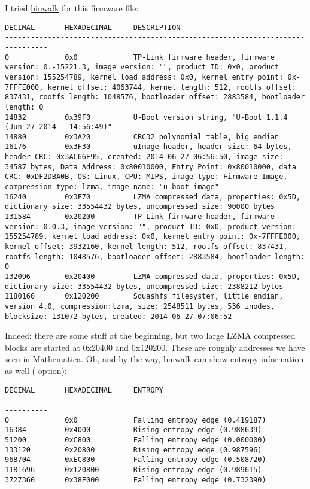 I tried \href{http://binwalk.org/}{binwalk} for this firmware file:

\begin{lstlisting}
DECIMAL       HEXADECIMAL     DESCRIPTION
--------------------------------------------------------------------------------
0             0x0             TP-Link firmware header, firmware version: 0.-15221.3, image version: "", product ID: 0x0, product version: 155254789, kernel load address: 0x0, kernel entry point: 0x-7FFFE000, kernel offset: 4063744, kernel length: 512, rootfs offset: 837431, rootfs length: 1048576, bootloader offset: 2883584, bootloader length: 0
14832         0x39F0          U-Boot version string, "U-Boot 1.1.4 (Jun 27 2014 - 14:56:49)"
14880         0x3A20          CRC32 polynomial table, big endian
16176         0x3F30          uImage header, header size: 64 bytes, header CRC: 0x3AC66E95, created: 2014-06-27 06:56:50, image size: 34587 bytes, Data Address: 0x80010000, Entry Point: 0x80010000, data CRC: 0xDF2DBA0B, OS: Linux, CPU: MIPS, image type: Firmware Image, compression type: lzma, image name: "u-boot image"
16240         0x3F70          LZMA compressed data, properties: 0x5D, dictionary size: 33554432 bytes, uncompressed size: 90000 bytes
131584        0x20200         TP-Link firmware header, firmware version: 0.0.3, image version: "", product ID: 0x0, product version: 155254789, kernel load address: 0x0, kernel entry point: 0x-7FFFE000, kernel offset: 3932160, kernel length: 512, rootfs offset: 837431, rootfs length: 1048576, bootloader offset: 2883584, bootloader length: 0
132096        0x20400         LZMA compressed data, properties: 0x5D, dictionary size: 33554432 bytes, uncompressed size: 2388212 bytes
1180160       0x120200        Squashfs filesystem, little endian, version 4.0, compression:lzma, size: 2548511 bytes, 536 inodes, blocksize: 131072 bytes, created: 2014-06-27 07:06:52
\end{lstlisting}

Indeed: there are some stuff at the beginning, but two large LZMA compressed blocks are started at 0x20400 and 0x120200.
These are roughly addresses we have seen in Mathematica.
Oh, and by the way, binwalk can show entropy information as well ( option):

\begin{lstlisting}
DECIMAL       HEXADECIMAL     ENTROPY
--------------------------------------------------------------------------------
0             0x0             Falling entropy edge (0.419187)
16384         0x4000          Rising entropy edge (0.988639)
51200         0xC800          Falling entropy edge (0.000000)
133120        0x20800         Rising entropy edge (0.987596)
968704        0xEC800         Falling entropy edge (0.508720)
1181696       0x120800        Rising entropy edge (0.989615)
3727360       0x38E000        Falling entropy edge (0.732390)
\end{lstlisting}

